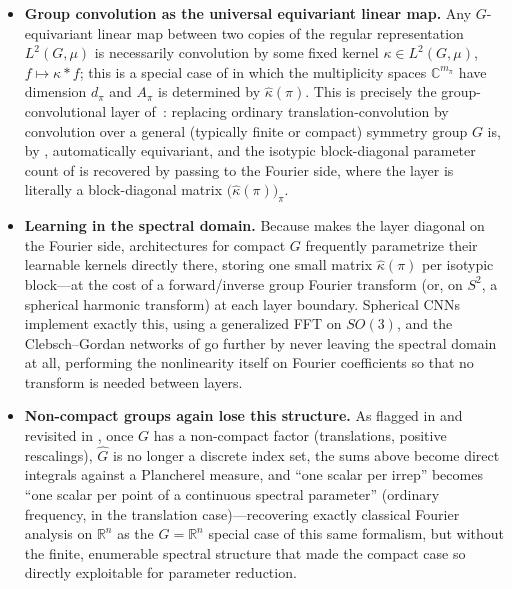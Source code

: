 \documentclass[11pt]{article}
\theoremstyle{plain}
\theoremstyle{definition}
\begin{document}
\begin{itemize}
    \item \textbf{Group convolution as the universal equivariant linear
    map.} Any $G$-equivariant linear map between two copies of the regular
    representation $L^2(G,\mu)$ is necessarily convolution by some fixed
    kernel $\kappa \in L^2(G,\mu)$, $f \mapsto \kappa * f$; this is a special
    case of  in which the multiplicity
    spaces $\mathbb{C}^{m_\pi}$ have dimension $d_\pi$ and $A_\pi$ is
    determined by $\widehat{\kappa}(\pi)$. This is precisely the
    group-convolutional layer of~\citep{cohen2014}: replacing ordinary
    translation-convolution by convolution over a general (typically finite
    or compact) symmetry group $G$ is, by
    , automatically equivariant,
    and the isotypic block-diagonal parameter count of
     is recovered by passing to the
    Fourier side, where the layer is literally a block-diagonal matrix
    $\bigl(\widehat{\kappa}(\pi)\bigr)_{\pi}$.
    \item \textbf{Learning in the spectral domain.} Because
     makes the layer diagonal on the Fourier
    side, architectures for compact $G$ frequently
    parametrize their learnable kernels directly there, storing one small
    matrix $\widehat{\kappa}(\pi)$ per
    isotypic block---at the cost of a forward/inverse group Fourier
    transform (or, on $S^2$, a spherical harmonic transform) at each layer
    boundary. Spherical CNNs \citep{cohen2018} implement exactly this,
    using a generalized FFT on $SO(3)$, and the Clebsch--Gordan networks
    of \citet{kondor2018p3icml} go further by never leaving the spectral
    domain at all, performing the nonlinearity itself on Fourier
    coefficients so that no transform is needed between layers.
    \item \textbf{Non-compact groups again lose this structure.} As
    flagged in  and revisited in
    , once $G$ has a non-compact
    factor (translations, positive rescalings), $\widehat{G}$ is no longer
    a discrete index set, the sums above become direct integrals against a
    Plancherel measure, and ``one scalar per irrep'' becomes ``one scalar per
    point of a continuous spectral parameter'' (ordinary frequency, in the
    translation case)---recovering exactly classical Fourier analysis on
    $\mathbb{R}^n$ as the $G = \mathbb{R}^n$ special case of this same
    formalism, but without the finite, enumerable spectral structure that
    made the compact case so directly exploitable for parameter reduction.
\end{itemize}
\end{document}
